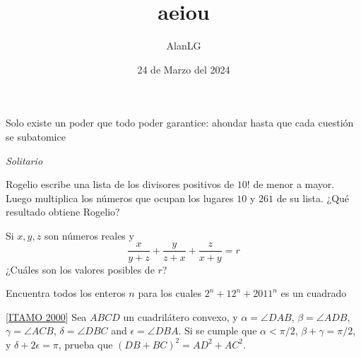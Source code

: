 \documentclass[11pt]{scrartcl}
\title{aeiou}
\author{AlanLG}
\date{24 de Marzo del 2024}
\begin{document}
\maketitle

\epigraph{Solo existe un poder que todo poder garantice: ahondar hasta que cada cuestión se subatomice}
{\emph{Solitario}}


\begin{problem}
    Rogelio escribe una lista de los divisores positivos de $10!$ de menor a mayor. Luego multiplica los números
    que ocupan los lugares $10$ y $261$ de su lista. ¿Qué resultado obtiene Rogelio?
    

\end{problem}
\vspace{2.5cm}
\begin{problem}
    
    Si $x,y,z$ son números reales y 
    \[\frac{x}{y+z}+\frac{y}{z+x}+\frac{z}{x+y}=r\]
¿Cuáles son los valores posibles de $r$?
\end{problem}
\vspace{2.5cm}
\begin{problem}
Encuentra todos los enteros $n$ para los cuales $2^n+12^n+2011^n$ es un cuadrado
\begin{center}

\end{center}
\end{problem}
\vspace{2.5cm}
\begin{problem}
 
    [\href{https://artofproblemsolving.com/community/c1068820h2975916p26675216}{ITAMO 2000}] 
    Sea $ABCD$ un cuadrilátero convexo, y $\alpha=\angle DAB$, $\beta=\angle ADB$, $\gamma=\angle ACB$, $\delta= \angle DBC$ and $\epsilon=\angle DBA$. Si se cumple que $\alpha<\pi/2$, $\beta+\gamma=\pi /2$, y $\delta+2\epsilon=\pi$, prueba que $(DB+BC)^2=AD^2+AC^2$.

\end{problem}
\end{document}
